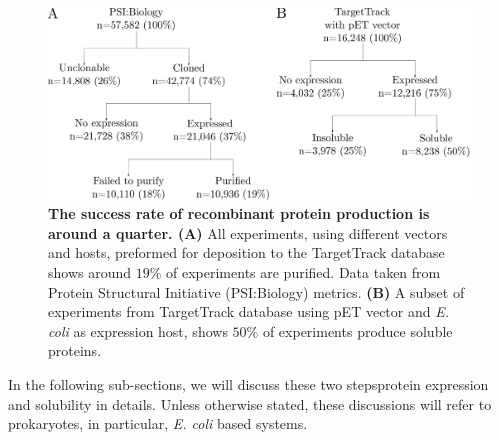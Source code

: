 \begin{figure}[htbp!]
\center
\includegraphics[width=1\textwidth]{chapters/Introduction/Figures/Status_of_protein_expression(2).pdf}
\caption[The success rate of recombinant protein production is around a quarter.]{\textbf{The success rate of recombinant protein production is around a quarter. (A)} All experiments, using different vectors and hosts, preformed for deposition to the TargetTrack database shows around $19\%$ of experiments are purified. Data taken from Protein Structural Initiative (PSI:Biology) metrics. \textbf{(B)} A subset of experiments from TargetTrack database using pET vector and \textit{E. coli} as expression host, shows $50\%$ of experiments produce soluble proteins. }%
\label{fig:fail_succ}
\end{figure}


In the following sub-sections, we will discuss these two steps\textemdash protein expression and solubility in details. Unless otherwise stated, these discussions will refer to prokaryotes, in particular, \textit{E. coli} based systems. 
















